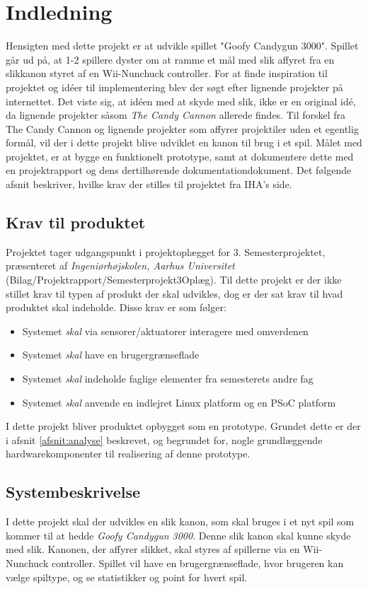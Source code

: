 \chapter{Indledning}
Hensigten med dette projekt er at udvikle spillet "Goofy Candygun 3000". Spillet går ud på, at 1-2 spillere dyster om at ramme et mål med slik affyret fra en slikkanon styret af en Wii-Nunchuck controller. For at finde inspiration til projektet og idéer til implementering blev der søgt efter lignende projekter på internettet. Det viste sig, at idéen med at skyde med slik, ikke er en original idé, da lignende projekter såsom \textit{The Candy Cannon} \cite{CandyCannon} allerede findes. Til forskel fra The Candy Cannon og lignende projekter som affyrer projektiler uden et egentlig formål, vil der i dette projekt blive udviklet en kanon til brug i et spil. 
Målet med projektet, er at bygge en funktionelt prototype, samt at dokumentere dette med en projektrapport og dens dertilhørende dokumentationdokument. 
Det følgende afsnit beskriver, hvilke krav der stilles til projektet fra IHA's side.

\section{Krav til produktet}
Projektet tager udgangspunkt i projektoplægget for 3. Semesterprojektet, præsenteret af \textit{Ingeniørhøjskolen, Aarhus Universitet} (Bilag/Projektrapport/Semesterprojekt3Oplæg). Til dette projekt er der ikke stillet krav til typen af produkt der skal udvikles, dog er der sat krav til hvad produktet skal indeholde. Disse krav er som følger:

\begin{itemize}
	\item{Systemet \textit{skal} via sensorer/aktuatorer interagere med omverdenen}
	\item{Systemet \textit{skal} have en brugergrænseflade}
	\item{Systemet \textit{skal} indeholde faglige elementer fra semesterets andre fag}
	\item{Systemet \textit{skal} anvende en indlejret Linux platform og en PSoC platform}
\end{itemize}

\noindent I dette projekt bliver produktet opbygget som en prototype. Grundet dette er der i afsnit \ref{afsnit:analyse} beskrevet, og begrundet for, nogle grundlæggende hardwarekomponenter til realisering af denne prototype.


\section{Systembeskrivelse}
\label{afsnit:systembeskrivelse}
I dette projekt skal der udvikles en slik kanon, som skal bruges i et nyt spil som kommer til at hedde \textit{Goofy Candygun 3000}. Denne slik kanon skal kunne skyde med slik. Kanonen, der affyrer slikket, skal styres af spillerne via en Wii-Nunchuck controller. Spillet vil have en brugergrænseflade, hvor brugeren kan vælge spiltype, og se statistikker og point for hvert spil. \newline

